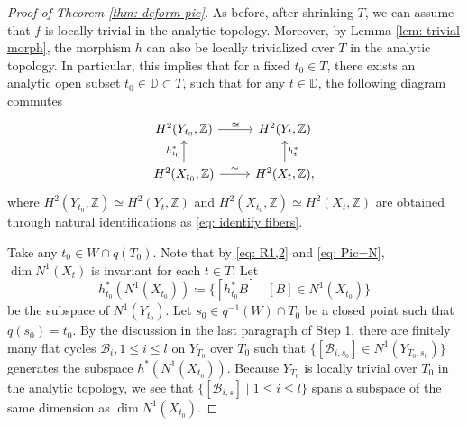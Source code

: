 \documentclass[11pt,oneside,reqno]{amsart}
\numberwithin{equation}{section}
\theoremstyle{definition}
\newcommand{\bZ}{\mathbb{Z}}
\newcommand{\mB}{\mathcal{B}}
\begin{document}
\begin{proof}[Proof of Theorem \ref{thm: deform pic}]
As before, after shrinking $T$, we can assume that $f$ is locally trivial in the analytic topology. Moreover, by Lemma \ref{lem: trivial morph}, the morphism $h$ can also be locally trivialized over $T$ in the analytic topology. In particular, this implies that for a fixed $t_0\in T$, there exists an analytic open subset  $t_0\in \mathbb D \subset T$, such that for any $t\in \mathbb D$, the following diagram commutes
\[
 	\begin{tikzcd}
	 H^2(Y_{t_0}, \bZ)\arrow[r, "\simeq"] &H^2(Y_{t}, \bZ) \\
	 H^2(X_{t_0}, \bZ)\arrow[u, "h_{t_0}^*"]\arrow[r, "\simeq"] &H^2(X_{t}, \bZ) \arrow[u, "h_{t}^*", swap],
	\end{tikzcd}   
\]
where $H^2(Y_{t_0}, \bZ) \simeq H^2(Y_{t}, \bZ)$ and $H^2(X_{t_0}, \bZ)\simeq H^2(X_{t}, \bZ)$ are obtained through natural identifications as \eqref{eq: identify fibers}. 

Take any $t_0 \in W \cap q(T_0)$. Note that by \eqref{eq: R1,2} and \eqref{eq: Pic=N}, $\dim N^1(X_{t})$ is invariant for each $t\in T$. Let 
\[
h_{t_0}^*(N^1(X_{t_0}))\coloneqq \{[h_{t_0}^*B] \mid [B] \in N^1(X_{t_0})\}
\] be the subspace of $N^1(Y_{t_0})$. Let $s_0\in q^{-1}(W)\cap T_0$ be a closed point such that $q(s_0)=t_0$. By the discussion in the last paragraph of Step 1, there are finitely many flat cycles $\mB_i, 1 \leq i \leq l$ on $Y_{T_0}$ over $T_0$ such that $\{[\mB_{i,s_0}]\in N^1(Y_{T_0, s_0})\}$ generates the subspace $h^*(N^1(X_{t_0}))$. Because $Y_{T_0}$ is locally trivial over $T_0$ in the analytic topology, we see that $\{[\mB_{i,s}] \mid 1 \leq i \leq l\}$ spans a subspace of the same dimension as $\dim N^1(X_{t_0})$. 


\end{proof}
\end{document}
